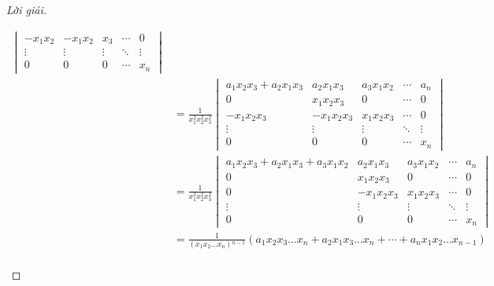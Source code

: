 \documentclass[class=linear-algebra,crop=false]{standalone}
\begin{document}
\begin{proof}[Lời giải]
\begin{enumerate}[label = (\alph*)]
\begin{align*}
\begin{vmatrix}
				      -x_{1}x_{2}             & -x_{1}x_{2} & x_{3}  & \cdots & 0      \\
				      \vdots                  & \vdots      & \vdots & \ddots & \vdots \\
				      0                       & 0           & 0      & \cdots & x_{n}
			      \end{vmatrix}                                                                                    \\
			       & = \frac{1}{x^{2}_{1}x^{2}_{2}x^{2}_{3}}
			      \begin{vmatrix}
				      a_{1}x_{2}x_{3} + a_{2}x_{1}x_{3} & a_{2}x_{1}x_{3}  & a_{3}x_{1}x_{2} & \cdots & a_{n}  \\
				      0                                 & x_{1}x_{2}x_{3}  & 0               & \cdots & 0      \\
				      -x_{1}x_{2}x_{3}                  & -x_{1}x_{2}x_{3} & x_{1}x_{2}x_{3} & \cdots & 0      \\
				      \vdots                            & \vdots           & \vdots          & \ddots & \vdots \\
				      0                                 & 0                & 0               & \cdots & x_{n}
			      \end{vmatrix}                                                            \\
			       & = \frac{1}{x^{2}_{1}x^{2}_{2}x^{2}_{3}}
			      \begin{vmatrix}
				      a_{1}x_{2}x_{3} + a_{2}x_{1}x_{3} + a_{3}x_{1}x_{2} & a_{2}x_{1}x_{3}  & a_{3}x_{1}x_{2} & \cdots & a_{n}  \\
				      0                                                   & x_{1}x_{2}x_{3}  & 0               & \cdots & 0      \\
				      0                                                   & -x_{1}x_{2}x_{3} & x_{1}x_{2}x_{3} & \cdots & 0      \\
				      \vdots                                              & \vdots           & \vdots          & \ddots & \vdots \\
				      0                                                   & 0                & 0               & \cdots & x_{n}
			      \end{vmatrix}                                          \\
			       & = \frac{1}{(x_{1}x_{2}\ldots x_{n}){}^{n-1}}(a_{1}x_{2}x_{3}\ldots x_{n} + a_{2}x_{1}x_{3}\ldots x_{n} + \cdots + a_{n}x_{1}x_{2}\ldots x_{n-1}) \\

\end{align*}
\end{enumerate}
\end{proof}
\end{document}
